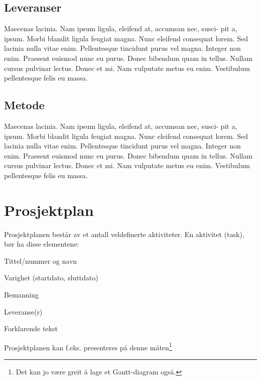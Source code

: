 \documentclass[11pt,a4paper]{report}
\begin{document}
\subsection*{Leveranser}

Maecenas lacinia. Nam ipsum ligula, eleifend at, accumsan nec, susci- pit a, ipsum. Morbi blandit ligula feugiat magna. Nunc eleifend consequat lorem. Sed lacinia nulla vitae enim. Pellentesque tincidunt purus vel magna. Integer non enim. Praesent euismod nunc eu purus. Donec bibendum quam in tellus. Nullam cursus pulvinar lectus. Donec et mi. Nam vulputate metus eu enim. Vestibulum pellentesque felis eu massa.

\subsection*{Metode}
Maecenas lacinia. Nam ipsum ligula, eleifend at, accumsan nec, susci- pit a, ipsum. Morbi blandit ligula feugiat magna. Nunc eleifend consequat lorem. Sed lacinia nulla vitae enim. Pellentesque tincidunt purus vel magna. Integer non enim. Praesent euismod nunc eu purus. Donec bibendum quam in tellus. Nullam cursus pulvinar lectus. Donec et mi. Nam vulputate metus eu enim. Vestibulum pellentesque felis eu massa.


\section*{Prosjektplan}

Prosjektplanen består av et antall veldefinerte aktiviteter. En aktivitet (task), bør ha disse elementene: 

\begin{compactitem}
\item Tittel/nummer og navn
\item Varighet (startdato, sluttdato)
\item Bemanning 
\item Leveranse(r)
\item Forklarende tekst
\end{compactitem}

Prosjektplanen kan f.eks. presenteres på denne måten\footnote{Det kan jo være greit å lage et Gantt-diagram også.}
\end{document}
